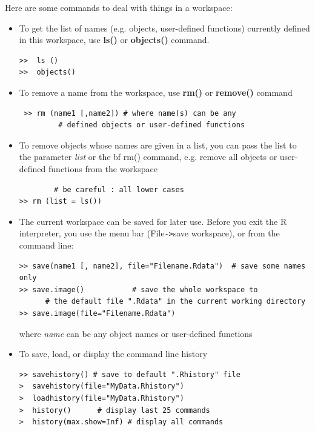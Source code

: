 Here are some commands to deal with things in a workspace:
\begin{itemize}
\item To get the list of names (e.g. objects, user-defined
  functions) currently defined in this workspace, use {\bf ls()}
  or {\bf objects()} command.  
\begin{lstlisting}
>>  ls ()
>>  objects()
\end{lstlisting}

\item To remove a name from the workspace, use {\bf rm()} or {\bf
    remove()} command
\begin{lstlisting}
 >> rm (name1 [,name2]) # where name(s) can be any
         # defined objects or user-defined functions
\end{lstlisting}

\item To remove objects whose names are given in a list, you can pass
  the list to the parameter {\it list} or the {bf rm()} command,
  e.g. remove all objects or user-defined functions from the workspace

\begin{lstlisting}
        # be careful : all lower cases
>> rm (list = ls()) 
\end{lstlisting}

\item The current workspace can be saved for later use. Before you
  exit the R interpreter, you use the menu bar (File\verb|->|save workspace),
  or from the command line:
\begin{lstlisting}
>> save(name1 [, name2], file="Filename.Rdata")  # save some names only
>> save.image()           # save the whole workspace to 
      # the default file ".Rdata" in the current working directory
>> save.image(file="Filename.Rdata")
\end{lstlisting}
  where {\it name} can be any object names or user-defined
  functions

\item To save, load, or display the command line history 
\begin{lstlisting}
>> savehistory() # save to default ".Rhistory" file
>  savehistory(file="MyData.Rhistory") 
>  loadhistory(file="MyData.Rhistory") 
>  history()      # display last 25 commands
>  history(max.show=Inf) # display all commands
\end{lstlisting}

\end{itemize}

